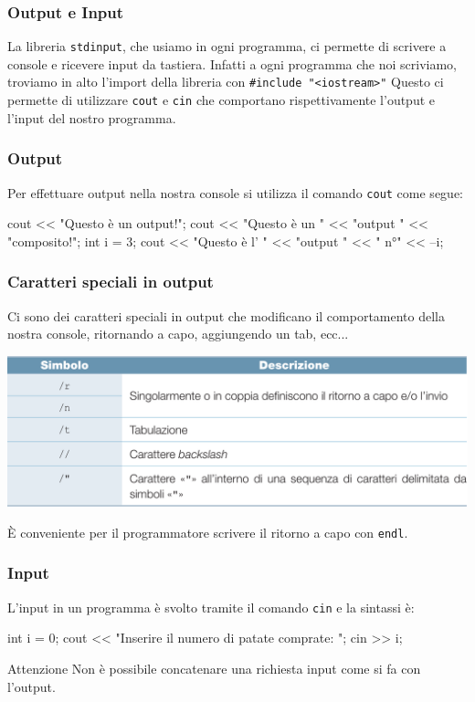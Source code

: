 \documentclass[handout]{beamer}
\begin{document}
    \begin{frame}[fragile]
        \frametitle{Output e Input}
        La libreria \texttt{stdinput}, che usiamo in ogni programma, ci permette di scrivere a console e ricevere input da tastiera. Infatti a ogni programma che noi scriviamo, troviamo in alto l'import della libreria con \texttt{#include "<iostream>"}
        Questo ci permette di utilizzare \texttt{cout} e \texttt{cin} che comportano rispettivamente l'output e l'input del nostro programma.
    \end{frame}

    \begin{frame}[fragile]
        \frametitle{Output}
        Per effettuare output nella nostra console si utilizza il comando \texttt{cout} come segue:
        \begin{cppcode}
            cout << "Questo è un output!";
            cout << "Questo è un " << "output " << "composito!";
            int i = 3;
            cout << "Questo è l' " << "output " << " n°" << --i;
        \end{cppcode}
    \end{frame}

    \begin{frame}[fragile]
        \frametitle{Caratteri speciali in output}
        Ci sono dei caratteri speciali in output che modificano il comportamento della nostra console, ritornando a capo, aggiungendo un tab, ecc... \\
        \begin{center}
            \includegraphics[scale=0.3]{img/escape_sequences.png}
        \end{center}
        È conveniente per il programmatore scrivere il ritorno a capo con \texttt{endl}.
    \end{frame}

    \begin{frame}[fragile]
        \frametitle{Input}
        L'input in un programma è svolto tramite il comando \texttt{cin} e la sintassi è:
        \begin{cppcode}
            int i = 0;
            cout << "Inserire il numero di patate comprate: ";
            cin >> i;
        \end{cppcode}
        \begin{block}{Attenzione}
            Non è possibile concatenare una richiesta input come si fa con l'output.
        \end{block}
    \end{frame}
\end{document}
